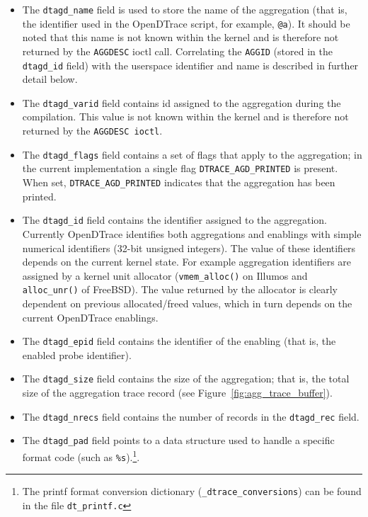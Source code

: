 \begin{itemize}

	\item The \texttt{dtagd\_name} field is used to store the name of the
aggregation (that is, the identifier used in the OpenDTrace script, for example,
\texttt{@a}). It should be noted that this name is not known within the kernel and
is therefore not returned by the \texttt{AGGDESC} ioctl call. Correlating the
\texttt{AGGID} (stored in the \texttt{dtagd\_id} field) with the userspace
identifier and name is described in further detail below.

	\item The \texttt{dtagd\_varid} field contains id assigned to the
aggregation during the compilation. This value is not known within the kernel
and is therefore not returned by the \texttt{AGGDESC ioctl}.

	\item The \texttt{dtagd\_flags} field contains a set of flags that apply to
the aggregation; in the current implementation a single flag 
\texttt{DTRACE\_AGD\_PRINTED} is present. When set,
\texttt{DTRACE\_AGD\_PRINTED} indicates that the aggregation has been printed.

	\item The \texttt{dtagd\_id} field contains the identifier assigned to the
aggregation. Currently OpenDTrace identifies both aggregations and enablings with
simple numerical identifiers (32-bit unsigned integers). The value of these
identifiers depends on the current kernel state. For example aggregation identifiers
are assigned by a kernel unit allocator (\texttt{vmem\_alloc()} on Illumos and
\texttt{alloc\_unr()} of FreeBSD). The value returned by the allocator is
clearly dependent on previous allocated/freed values, which in turn depends on
the current OpenDTrace enablings.

	\item The \texttt{dtagd\_epid} field contains the identifier of the enabling
(that is, the enabled probe identifier).

	\item The \texttt{dtagd\_size} field contains the size of the aggregation;
that is, the total size of the aggregation trace record (see
Figure~\ref{fig:agg_trace_buffer}).

	\item The \texttt{dtagd\_nrecs} field contains the number of records in
the \texttt{dtagd\_rec} field.

	\item The \texttt{dtagd\_pad} field points to a data structure used to
handle a specific format code (such as \texttt{\%s}).\footnote{The printf format
conversion dictionary (\texttt{\_dtrace\_conversions}) can be found in the
		file \texttt{dt\_printf.c}}.


\end{itemize}
